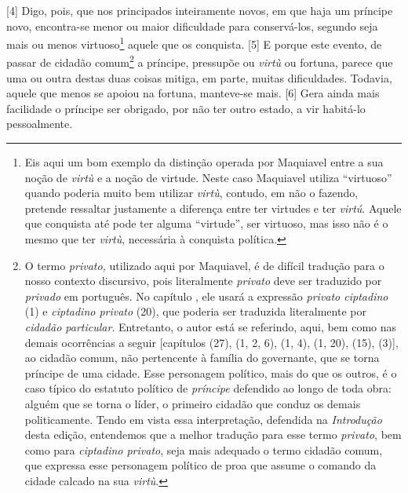 {[}4{]} Digo, pois, que nos principados inteiramente novos, em que haja
um príncipe novo, encontra-se menor ou maior dificuldade para
conservá-los, segundo seja mais ou menos virtuoso\footnote{Eis aqui um
  bom exemplo da distinção operada por Maquiavel entre a sua noção de
  \emph{virtù} e a noção de virtude. Neste caso Maquiavel utiliza
  ``virtuoso'' quando poderia muito bem utilizar \emph{virtù}, contudo,
  em não o fazendo, pretende ressaltar justamente a diferença entre ter
  virtudes e ter \emph{virtú}. Aquele que conquista até pode ter alguma
  ``virtude'', ser virtuoso, mas isso não é o mesmo que ter
  \emph{virtù}, necessária à conquista política.} aquele que os
conquista. {[}5{]} E porque este evento, de passar de cidadão
comum\footnote{O termo \emph{privato,} utilizado aqui por Maquiavel, é
  de difícil tradução para o nosso contexto discursivo, pois
  literalmente \emph{privato} deve ser traduzido por \emph{privado} em
  português. No capítulo , ele usará a expressão \emph{privato
  ciptadino} (1) e \emph{ciptadino privato} (20), que poderia ser
  traduzida literalmente por \emph{cidadão particular}. Entretanto, o
  autor está se referindo, aqui, bem como nas demais ocorrências a
  seguir {[}capítulos  (27),  (1, 2, 6),  (1, 4),  (1, 20),
   (15),  (3){]}, ao cidadão comum, não pertencente à família do
  governante, que se torna príncipe de uma cidade. Esse personagem
  político, mais do que os outros, é o caso típico do estatuto político
  de \emph{príncipe} defendido ao longo de toda obra: alguém que se
  torna o líder, o primeiro cidadão que conduz os demais politicamente.
  Tendo em vista essa interpretação, defendida na \emph{Introdução}
  desta edição, entendemos que a melhor tradução para esse termo
  \emph{privato}, bem como para \emph{ciptadino privato}, seja mais
  adequado o termo cidadão comum, que expressa esse personagem político
  de proa que assume o comando da cidade calcado na sua \emph{virtù}.} a
príncipe, pressupõe ou \emph{virtù} ou fortuna, parece que uma ou outra
destas duas coisas mitiga, em parte, muitas dificuldades. Todavia,
aquele que menos se apoiou na fortuna, manteve-se mais. {[}6{]} Gera
ainda mais facilidade o príncipe ser obrigado, por não ter outro estado,
a vir habitá-lo pessoalmente.

